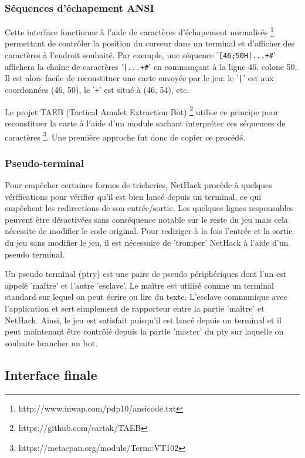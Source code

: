 \documentclass[a4paper]{report}
\begin{document}
\subsubsection*{Séquences d'échapement ANSI}

Cette interface fonctionne à l'aide de caractères d'échapement normalisés \footnote{http://www.inwap.com/pdp10/ansicode.txt} permettant de contrôler la position du curseur dans un terminal et d'afficher des caractères à l'endroit souhaité. Par exemple, une séquence '\verb![46;50H|...+#!' affichera la chaîne de caractères '\verb!|...+#!' en commançant à la ligne 46, colone 50. Il est alors facile de reconstituer une carte envoyée par le jeu: le '\verb!|!' est aux coordonnées (46, 50), le '\verb!+!' est situé à (46, 54), etc.
	
	Le projet TAEB (Tactical Amulet Extraction Bot) \footnote{https://github.com/sartak/TAEB} utilise ce principe pour reconstituer la carte à l'aide d'un module sachant interpréter ces séquences de caractères \footnote{https://metacpan.org/module/Term::VT102}. Une première approche fut donc de copier ce procédé.

\subsubsection*{Pseudo-terminal}

Pour empêcher certaines formes de tricheries, NetHack procède à quelques vérifications pour vérifier qu'il est bien lancé depuis un terminal, ce qui empêchent les redirections de son entrée/sortie. Les quelques lignes responsables peuvent être désactivées sans conséquence notable sur le reste du jeu mais cela nécessite de modifier le code original. Pour rediriger à la fois l'entrée et la sortie du jeu sans modifier le jeu, il est nécessaire de 'tromper' NetHack à l'aide d'un pseudo terminal.

Un pseudo terminal (ptry) est une paire de pseudo périphériques dont l'un est appelé 'maître' et l'autre 'esclave'. Le maître est utilisé comme un terminal standard sur lequel on peut écrire ou lire du texte. L'esclave communique avec l'application et sert simplement de rapporteur entre la partie 'maître' et NetHack. Ainsi, le jeu est satisfait puisqu'il est lancé depuis un terminal et il peut maintenant être contrôlé depuis la partie 'master' du pty sur laquelle on souhaite brancher un bot.

\subsection{Interface finale}
\end{document}
